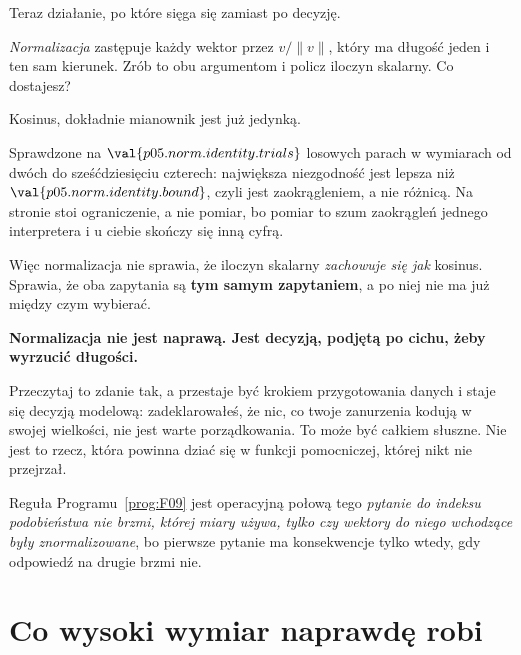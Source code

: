 \begin{fr}
Teraz działanie, po które sięga się zamiast po decyzję.

\emph{Normalizacja} zastępuje każdy wektor przez $v / \lVert v \rVert$, który
ma długość jeden i ten sam kierunek. Zrób to obu argumentom i policz iloczyn
skalarny. Co dostajesz?
\nextframe
\end{fr}

\begin{fr}
\begin{ansblock}
Kosinus, dokładnie \dash{} mianownik jest już jedynką.
\end{ansblock}

Sprawdzone na $\val{p05.norm.identity.trials}$ losowych parach w wymiarach od
dwóch do sześćdziesięciu czterech: największa niezgodność jest lepsza niż
$\val{p05.norm.identity.bound}$, czyli jest zaokrągleniem, a nie różnicą. Na
stronie stoi ograniczenie, a nie pomiar, bo pomiar to szum zaokrągleń jednego
interpretera i u ciebie skończy się inną cyfrą.

Więc normalizacja nie sprawia, że iloczyn skalarny \emph{zachowuje się jak}
kosinus. Sprawia, że oba zapytania są \textbf{tym samym zapytaniem}, a po niej
nie ma już między czym wybierać.
\end{fr}

\begin{fr}
\begin{trapbox}
\textbf{Normalizacja nie jest naprawą. Jest decyzją, podjętą po cichu, żeby
wyrzucić długości.}

Przeczytaj to zdanie tak, a przestaje być krokiem przygotowania danych i staje
się decyzją modelową: zadeklarowałeś, że nic, co twoje zanurzenia kodują w
swojej wielkości, nie jest warte porządkowania. To może być całkiem słuszne.
Nie jest to rzecz, która powinna dziać się w funkcji pomocniczej, której nikt
nie przejrzał.

Reguła Programu~\ref{prog:F09} jest operacyjną połową tego \dash{} \emph{pytanie
do indeksu podobieństwa nie brzmi, której miary używa, tylko czy wektory do
niego wchodzące były znormalizowane}, bo pierwsze pytanie ma konsekwencje tylko
wtedy, gdy odpowiedź na drugie brzmi nie.
\end{trapbox}
\end{fr}

\section{Co wysoki wymiar naprawdę robi}
\label{sec:P05-high-dimension}

